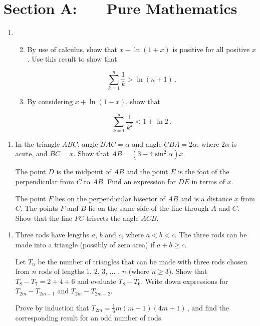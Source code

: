 \documentclass[a4, 11pt]{report}
\newlength{\qspace}
\newcounter{qnumber}
\newenvironment{question}%
 {\vspace{\qspace}
  \begin{enumerate}[\bfseries 1\quad][10]%
    \setcounter{enumi}{\value{qnumber}}%
    \item%
 }
{
  \end{enumerate}
  \filbreak
  \stepcounter{qnumber}
 }
\newenvironment{questionparts}[1][1]%
 {
  \begin{enumerate}[\bfseries (i)]%
    \setcounter{enumii}{#1}
    \addtocounter{enumii}{-1}
    \setlength{\itemsep}{5mm}
    \setlength{\parskip}{8pt}
 }
 {
  \end{enumerate}
 }
\def\ge{\geqslant}
\renewcommand{\.}[1]{\ensuremath{\mathrm{#1}}}
\newcommand{\+}[1]{\ensuremath{\mathbf{#1}}}
\begin{document}
\setcounter{page}{2}

 
\section*{Section A: \ \ \ Pure Mathematics}

\begin{question}
\begin{questionparts}
\item By use of calculus, show that $x- \ln(1+x)$ is positive for all positive $x$. Use this result to  show that

\[
\sum_{k=1}^n \frac 1 k > \ln (n+1)
\,.
\]

\item By considering $ x+\ln (1-x)$, show that

\[
\sum_{k=1}^\infty \frac 1 {k^2} <1+ \ln 2 
\,.
\]
\end{questionparts}
\end{question}

\begin{question}
In the triangle $ABC$,  angle $BAC = \alpha$ and angle $CBA= 2\alpha$, where $2\alpha$ is acute, and $BC= x$. Show that $AB = (3-4 \sin^2\alpha)x$.

The point $D$ is the midpoint of $AB$ and the point $E$ is the foot of the perpendicular from $C$ to $AB$. Find an expression for $DE$ in terms of $x$. 

The point $F$ lies on the perpendicular bisector of $AB$ and is a distance $x$ from $C$. The points $F$ and $B$ lie on the same side of the line through $A$ and $C$. Show that the line $FC$ trisects the angle $ACB$.
\end{question}

\begin{question}
 Three rods have lengths $a$, $b$ and $c$, where $a<   b<   c$. The three rods can be made into a triangle (possibly of zero area) if $a+b\ge c$.

Let $T_{n}$ be the number of triangles that can be made with three rods chosen from $n$ rods of lengths $1$, $2$, $3$, $\ldots$ , $n$ (where $n\ge3$). Show that $T_8-T_7 = 2+4+6$ and evaluate $T_8 -T_6$. Write down  expressions for $T_{2m}-T_{2m-1}$ and $T_{2m} - T_{2m-2}$.

 Prove by induction  that $T_{2m}=\frac 16 m (m-1)(4m+1)\,$, and find the corresponding result for an odd number of rods.
\end{question}
\end{document}
